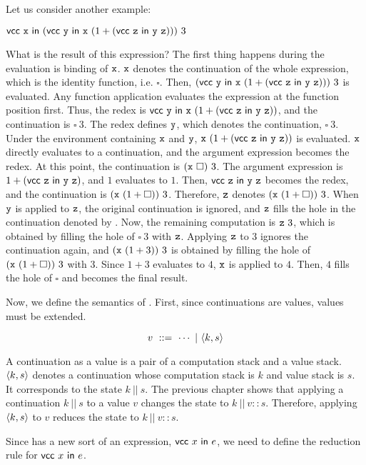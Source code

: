 Let us consider another example:

$
\textsf{vcc}\ \texttt{x}\ \textsf{in}\ (\textsf{vcc}\ \texttt{y}\ \textsf{in}\ \texttt{x}\ (1+(\textsf{vcc}\ \texttt{z}\ \textsf{in}\ \texttt{y}\ \texttt{z})))\ 3
$

What is the result of this expression?
The first thing happens during the evaluation is binding of $\texttt{x}$. $\texttt{x}$ denotes the
continuation of the whole expression, which is the identity function, i.e.
$\square$. Then,
$(\textsf{vcc}\ \texttt{y}\ \textsf{in}\ \texttt{x}\ (1+(\textsf{vcc}\ \texttt{z}\ \textsf{in}\ \texttt{y}\ \texttt{z})))\ 3$ is
evaluated. Any function application evaluates the expression at the function
position first. Thus, the redex is
$\textsf{vcc}\ \texttt{y}\ \textsf{in}\ \texttt{x}\ (1+(\textsf{vcc}\ \texttt{z}\ \textsf{in}\ \texttt{y}\ \texttt{z}))$, and the
continuation is $\square\ 3$. The redex defines $\texttt{y}$, which denotes the
continuation, $\square\ 3$. Under the environment containing $\texttt{x}$ and $\texttt{y}$,
$\texttt{x}\ (1+(\textsf{vcc}\ \texttt{z}\ \textsf{in}\ \texttt{y}\ \texttt{z}))$ is evaluated. $\texttt{x}$ directly
evaluates to a continuation, and the argument expression becomes the redex.
At this point, the continuation is $(\cx\ \square)\ 3$. The argument
expression is $1+(\textsf{vcc}\ \texttt{z}\ \textsf{in}\ \texttt{y}\ \texttt{z})$, and $1$ evaluates to $1$.
Then, $\textsf{vcc}\ \texttt{z}\ \textsf{in}\ \texttt{y}\ \texttt{z}$ becomes the redex, and the continuation is
$(\texttt{x}\ (1+\square))\ 3$. Therefore, $\texttt{z}$ denotes $(\texttt{x}\ (1+\square))\ 3$.
When $\texttt{y}$ is applied to $\texttt{z}$, the original continuation is ignored, and $\texttt{z}$ fills
the hole in the continuation denoted by \cy. Now, the remaining computation
is $\texttt{z}\ 3$, which is obtained by filling the hole of $\square\ 3$ with $\texttt{z}$.
Applying $\texttt{z}$ to $3$ ignores the continuation again, and $(\cx\ (1+3))\
3$ is obtained by filling the hole of $(\texttt{x}\ (1+\square))\ 3$ with $3$.
Since $1+3$ evaluates to $4$, $\texttt{x}$ is applied to $4$. Then, $4$ fills the hole of
$\square$ and becomes the final result.

Now, we define the semantics of \Lang. First, since continuations are values,
values must be extended.

\[
  v\ ::=\ \cdots\ |\ \contv{k}{s}
\]

A continuation as a value is a pair of a computation
stack and a value stack. $\langle k,s\rangle$ denotes a continuation whose computation
stack is $k$ and value stack is $s$. It corresponds to the state $k\ ||\ s$.
The previous chapter shows that applying a continuation $k\ ||\ s$ to a value
$v$ changes the state to $k\ ||\ v::s$. Therefore, applying $\langle k,s\rangle$
to $v$ reduces the state to $k\ ||\ v::s$.

Since \Lang has a new sort of an expression, $\textsf{vcc}\ x\ \textsf{in}\ e$, we need to define
the reduction rule for $\textsf{vcc}\ x\ \textsf{in}\ e$.

